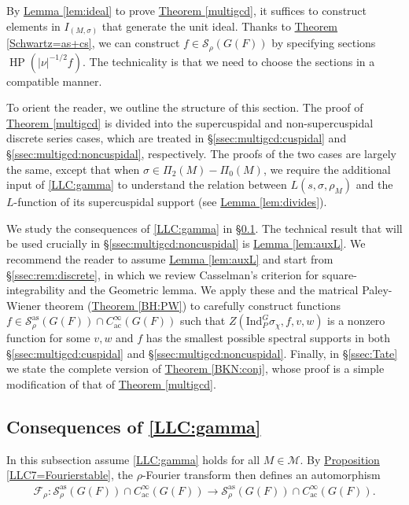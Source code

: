 \documentclass[10pt]{amsart}
\theoremstyle{definition}
\numberwithin{equation}{section}
\numberwithin{equation}{subsection}
\newcommand{\HP}{\mathop{\mathrm{HP}}\nolimits}
\begin{document}
By \hyperref[lem:ideal]{Lemma \ref{lem:ideal}} to prove \hyperref[multigcd]{Theorem \ref{multigcd}}, it suffices to construct elements in $I_{(M,\sigma)}$ that generate the unit ideal. Thanks to \hyperref[Schwartz=as+cs]{Theorem \ref{Schwartz=as+cs}}, we can construct $f\in \mathcal{S}_\rho(G(F))$ by specifying sections $\HP(|\nu|^{-1/2}f).$ The technicality is that we need to choose the sections in a compatible manner.

To orient the reader, we outline the structure of this section. The proof of \hyperref[multigcd]{Theorem \ref{multigcd}} is divided into the supercuspidal and non-supercuspidal discrete series cases, which are treated in \S \ref{ssec:multigcd:cuspidal} and \S \ref{ssec:multigcd:noncuspidal}, respectively. The proofs of the two cases are largely the same, except that when $\sigma\in \Pi_2(M)-\Pi_0(M)$, we require the additional input of \eqref{LLC:gamma} to understand the relation between $L(s,\sigma,\rho_M)$ and the $L$-function of its supercuspidal support (see \hyperref[lem:divides]{Lemma \ref{lem:divides}}).

We study the consequences of \eqref{LLC:gamma} in \S \ref{sec:LLC7}. The technical result that will be used crucially in \S \ref{ssec:multigcd:noncuspidal} is \hyperref[lem:auxL]{Lemma \ref{lem:auxL}}. We recommend the reader to assume \hyperref[lem:auxL]{Lemma \ref{lem:auxL}} and start from \S \ref{ssec:rem:discrete}, in which we review Casselman's criterion for square-integrability and the Geometric lemma. We apply these and the matrical Paley-Wiener theorem (\hyperref[BH:PW]{Theorem \ref{BH:PW}}) to carefully construct functions $f\in \mathcal{S}_\rho^{\mathrm{as}}(G(F))\cap C^\infty_{\mathrm{ac}}(G(F))$ such that $Z(\mathrm{Ind}_P^G \sigma_\chi,f,v,w)$ is a nonzero function for some $v,w$ and $f$ has the smallest possible spectral supports in both \S \ref{ssec:multigcd:cuspidal} and \S \ref{ssec:multigcd:noncuspidal}. Finally, in \S \ref{ssec:Tate} we state the complete version of \hyperref[BKN:conj]{Theorem \ref{BKN:conj}}, whose proof is a simple modification of that of \hyperref[multigcd]{Theorem \ref{multigcd}}.



\subsection{Consequences of \eqref{LLC:gamma}}\label{sec:LLC7}
In this subsection assume \eqref{LLC:gamma} holds for all $M\in \mathcal{M}$. By \hyperref[LLC7=Fourierstable]{Proposition \ref{LLC7=Fourierstable}}, the $\rho$-Fourier transform then defines an automorphism
\begin{align*}
    \mathcal{F}_\rho: \mathcal{S}_\rho^{\mathrm{as}}(G(F))\cap C^{\infty}_{\mathrm{ac}}(G(F))\longrightarrow \mathcal{S}_\rho^{\mathrm{as}}(G(F))\cap C^{\infty}_{\mathrm{ac}}(G(F)).
\end{align*}
\end{document}

